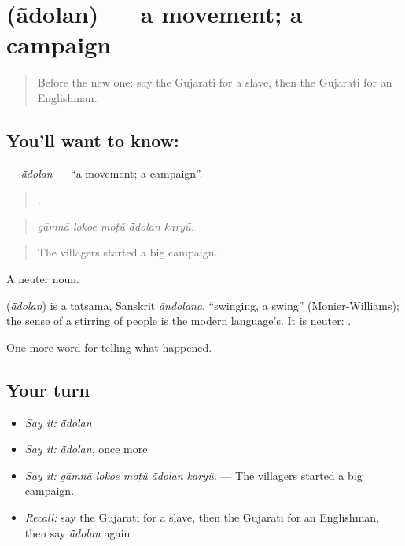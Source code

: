 \section[\texorpdfstring{\gu{આંદોલન} (ā̃dolan)}{આંદોલન (ā̃dolan)}]{ (ā̃dolan) — a movement; a campaign}

\label{lesson:GU-C325-adolan}



\begin{quote}
Before the new one: say the Gujarati for a slave, then the Gujarati for an Englishman.
\end{quote}

\subsection*{You'll want to know: }
\textbf{} — \emph{ā̃dolan} — \textquotedblleft{}a movement; a campaign\textquotedblright{}.

\begin{quote}
    .
\end{quote}

\begin{quote}
\emph{gāmnā lokoe moṭũ ā̃dolan karyũ.}
\end{quote}

\begin{quote}
The villagers started a big campaign.
\end{quote}

A neuter noun.

\begin{cousinweb}
\textbf{} (\emph{ā̃dolan}) is a tatsama, Sanskrit \emph{āndolana}, \textquotedblleft{}swinging, a swing\textquotedblright{} (Monier-Williams); the sense of a stirring of people is the modern language's. It is neuter: \textbf{ }.
\end{cousinweb}

\begin{grammarlens}[title={What you've built}]
One more word for telling what happened.
\end{grammarlens}

\subsection*{Your turn}
\begin{itemize}
\raggedright
  \item \emph{Say it:} \emph{ā̃dolan}
  \item \emph{Say it:} \emph{ā̃dolan}, once more
  \item \emph{Say it:} \emph{gāmnā lokoe moṭũ ā̃dolan karyũ.} — The villagers started a big campaign.
  \item \emph{Recall:} say the Gujarati for a slave, then the Gujarati for an Englishman, then say \emph{ā̃dolan} again
\end{itemize}

